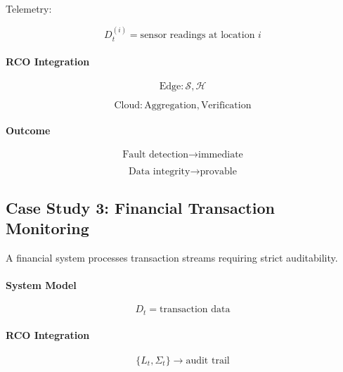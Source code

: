Telemetry:

\begin{equation}
D_t^{(i)} = \text{sensor readings at location } i
\end{equation}

\paragraph{RCO Integration}

\begin{equation}
\text{Edge}: \mathcal{S}, \mathcal{H}
\end{equation}

\begin{equation}
\text{Cloud}: \text{Aggregation}, \text{Verification}
\end{equation}

\paragraph{Outcome}

\begin{equation}
\text{Fault detection} \rightarrow \text{immediate}
\end{equation}

\begin{equation}
\text{Data integrity} \rightarrow \text{provable}
\end{equation}

\subsection{Case Study 3: Financial Transaction Monitoring}

A financial system processes transaction streams requiring strict auditability.

\paragraph{System Model}

\begin{equation}
D_t = \text{transaction data}
\end{equation}

\paragraph{RCO Integration}

\begin{equation}
\{L_t, \Sigma_t\} \rightarrow \text{audit trail}
\end{equation}


